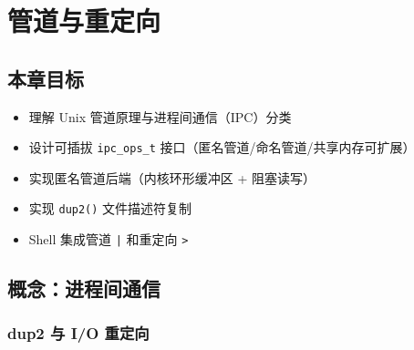 \chapter{管道与重定向}
\label{ch:pipe}

\section{本章目标}

\begin{itemize}
  \item 理解 Unix 管道原理与进程间通信（IPC）分类
  \item 设计可插拔 \texttt{ipc\_ops\_t} 接口（匿名管道/命名管道/共享内存可扩展）
  \item 实现匿名管道后端（内核环形缓冲区 + 阻塞读写）
  \item 实现 \texttt{dup2()} 文件描述符复制
  \item Shell 集成管道 \texttt{|} 和重定向 \texttt{>}
\end{itemize}

\section{概念：进程间通信}
\label{sec:pipe-concept}


\subsection{dup2 与 I/O 重定向}


